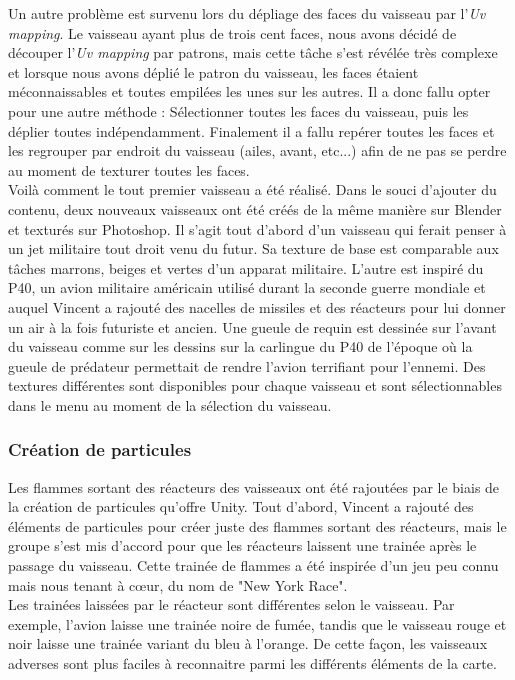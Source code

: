 \documentclass[12pt, titlepage]{article}
\begin{document}
\begin{spacing}{1.5}
Un autre problème est survenu lors du dépliage des faces du vaisseau par l’\textit{Uv mapping}.
Le vaisseau ayant plus de trois cent faces, nous avons décidé de découper l’\textit{Uv mapping} par patrons, mais cette tâche s’est révélée très complexe et lorsque nous avons déplié le patron du vaisseau, les faces étaient méconnaissables et toutes empilées les unes sur les autres. Il a donc fallu opter pour une autre méthode : Sélectionner toutes les faces du vaisseau, puis les déplier toutes indépendamment. Finalement il a fallu repérer toutes les faces et les regrouper par endroit du vaisseau (ailes, avant, etc...) afin de ne pas se perdre au moment de texturer toutes les faces.\\

Voilà comment le tout premier vaisseau a été réalisé. Dans le souci d'ajouter du contenu, deux nouveaux vaisseaux ont été créés de la même manière sur Blender et texturés sur Photoshop. Il s'agit tout d'abord d'un vaisseau qui ferait penser à un jet militaire tout droit venu du futur. Sa texture de base est comparable aux tâches marrons, beiges et vertes d’un apparat militaire. L'autre est inspiré du P40, un avion militaire américain utilisé durant la seconde guerre mondiale et auquel Vincent a rajouté des nacelles de missiles et des réacteurs pour lui donner un air à la fois futuriste et ancien. Une gueule de requin est dessinée sur l’avant du vaisseau comme sur les dessins sur la carlingue du P40 de l’époque où la gueule de prédateur permettait de rendre l’avion terrifiant pour l’ennemi.
Des textures différentes sont disponibles pour chaque vaisseau et sont sélectionnables dans le menu au moment de la sélection du vaisseau.\\

\subsubsection{Création de particules}

Les flammes sortant des réacteurs des vaisseaux ont été rajoutées par le biais de la création de particules qu'offre Unity. Tout d'abord, Vincent a rajouté des éléments de particules pour créer juste des flammes sortant des réacteurs, mais le groupe s'est mis d'accord pour que les réacteurs laissent une trainée après le passage du vaisseau. Cette trainée de flammes a été inspirée d’un jeu peu connu mais nous tenant à cœur, du nom de "New York Race". \\

Les trainées laissées par le réacteur sont différentes selon le vaisseau. Par exemple, l'avion laisse une trainée noire de fumée, tandis que le vaisseau rouge et noir laisse une trainée variant du bleu à l’orange. De cette façon, les vaisseaux adverses sont plus faciles à reconnaitre parmi les différents éléments de la carte. \\


\end{spacing}
\end{document}
